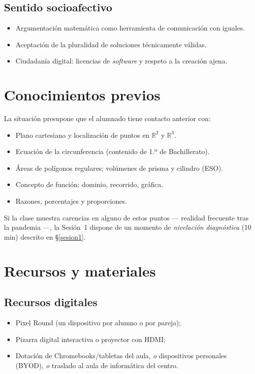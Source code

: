 \documentclass[12pt,a4paper]{scrartcl}
\begin{document}
\subsection{Sentido socioafectivo}
\begin{itemize}[leftmargin=1.3em,itemsep=0.15em,topsep=0.3em]
  \item Argumentación matemática como herramienta de comunicación con iguales.
  \item Aceptación de la pluralidad de soluciones técnicamente válidas.
  \item Ciudadanía digital: licencias de \emph{software} y respeto a la creación ajena.
\end{itemize}

\section{Conocimientos previos}

La situación presupone que el alumnado tiene contacto anterior con:

\begin{itemize}[leftmargin=1.3em,itemsep=0.15em,topsep=0.3em]
  \item Plano cartesiano y localización de puntos en $\mathbb{R}^2$ y $\mathbb{R}^3$.
  \item Ecuación de la circunferencia (contenido de 1.º de Bachillerato).
  \item Áreas de polígonos regulares; volúmenes de prisma y cilindro (ESO).
  \item Concepto de función: dominio, recorrido, gráfica.
  \item Razones, porcentajes y proporciones.
\end{itemize}

Si la clase muestra carencias en alguno de estos puntos --- realidad frecuente tras la pandemia ---, la Sesión~1 dispone de un momento de \emph{nivelación diagnóstica} (10 min) descrito en §\ref{sesion1}.

\section{Recursos y materiales}

\subsection{Recursos digitales}
\begin{itemize}[leftmargin=1.3em,itemsep=0.15em,topsep=0.3em]
  \item Pixel Round (un dispositivo por alumno o por pareja);
  \item Pizarra digital interactiva o proyector con HDMI;
  \item Dotación de Chromebooks/tabletas del aula, \emph{o} dispositivos personales (BYOD), \emph{o} traslado al aula de informática del centro.
\end{itemize}
\end{document}
